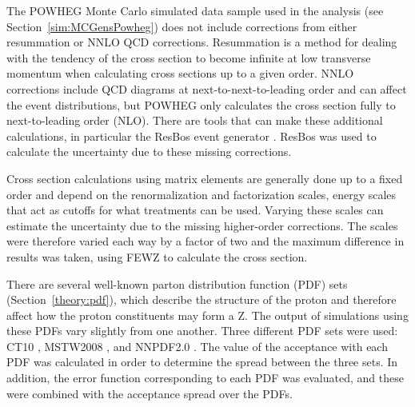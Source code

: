 The POWHEG \cite{powheg} Monte Carlo simulated data sample used in the analysis 
(see Section~\ref{sim:MCGensPowheg}) 
does not include corrections from either resummation or 
NNLO QCD corrections.  
Resummation is a method for dealing with 
the tendency of the cross section 
to become infinite at low transverse momentum 
when calculating cross sections up to a given order.  
NNLO corrections include QCD diagrams at next-to-next-to-leading 
order and can affect the event distributions, 
but POWHEG only calculates the cross section 
fully to next-to-leading order (NLO).  
There are tools that can make these additional calculations, 
in particular the ResBos event generator \cite{resbos}. %
ResBos was used to 
calculate the uncertainty due to these missing corrections.  



Cross section calculations using matrix elements 
are generally done up to a fixed order 
and depend on the renormalization and factorization scales, %
energy scales that act as cutoffs for what 
treatments can be used.  
Varying these scales can estimate the uncertainty due 
to the missing higher-order %
corrections. 
The scales were therefore varied each way by a factor of two 
and the maximum difference in results was taken, 
using FEWZ \cite{FEWZ2} to calculate the cross section.  %



There are several well-known
parton distribution function (PDF) sets
(Section~\ref{theory:pdf}), 
which describe the structure of the proton 
and therefore affect how the proton constituents 
may form a Z.  
The output of simulations
using these PDFs vary slightly from one another.
Three different PDF sets were used: 
CT10 \cite{CT10}, MSTW2008 \cite{MSTW}, and NNPDF2.0 \cite{NNPDF}.  
The value of the acceptance with each PDF was calculated 
in order to determine the spread between the three sets.  
In addition, the error function corresponding to each PDF 
was evaluated, 
and these were combined with the acceptance spread 
over the PDFs.  


